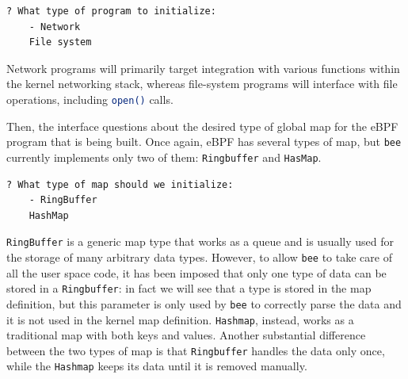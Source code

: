 \begin{lstlisting}[style=commandline, language=bash, caption={\colorbox{backcolour}{\lstinline[style=commandline, language=bash]|bee|} type of program selection.}]
	? What type of program to initialize: 
	- Network
	File system
\end{lstlisting}

Network programs will primarily target integration with various functions within the kernel networking stack, whereas file-system programs will interface with file operations, including \colorbox{backcolour}{\lstinline[style=commandline, language=bash, breaklines=true]|open()|} calls.

Then, the interface questions about the desired type of global map for the eBPF program that is being built.
Once again, eBPF has several types of map, but \colorbox{backcolour}{\lstinline[style=commandline, language=bash, breaklines=true]|bee|} currently implements only two of them: \colorbox{backcolour}{\lstinline[style=commandline, language=bash, breaklines=true]|Ringbuffer|} and \colorbox{backcolour}{\lstinline[style=commandline, language=bash, breaklines=true]|HasMap|}.

\begin{lstlisting}[style=commandline, language=bash, caption={\colorbox{backcolour}{\lstinline[style=commandline, language=bash]|bee|} map type selection.}]
	? What type of map should we initialize: 
	- RingBuffer
	HashMap
\end{lstlisting}

\colorbox{backcolour}{\lstinline[style=commandline, language=bash, breaklines=true]|RingBuffer|} is a generic map type that works as a queue and is usually used for the storage of many arbitrary data types.
However, to allow \colorbox{backcolour}{\lstinline[style=commandline, language=bash, breaklines=true]|bee|} to take care of all the user space code, it has been imposed that only one type of data can be stored in a \colorbox{backcolour}{\lstinline[style=commandline, language=bash, breaklines=true]|Ringbuffer|}: in fact we will see that a type is stored in the map definition, but this parameter is only used by \colorbox{backcolour}{\lstinline[style=commandline, language=bash, breaklines=true]|bee|} to correctly parse the data and it is not used in the kernel map definition. 
\colorbox{backcolour}{\lstinline[style=commandline, language=bash, breaklines=true]|Hashmap|}, instead, works as a traditional map with both keys and values.
Another substantial difference between the two types of map is that \colorbox{backcolour}{\lstinline[style=commandline, language=bash, breaklines=true]|Ringbuffer|} handles the data only once, while the \colorbox{backcolour}{\lstinline[style=commandline, language=bash, breaklines=true]|Hashmap|} keeps its data until it is removed manually.


